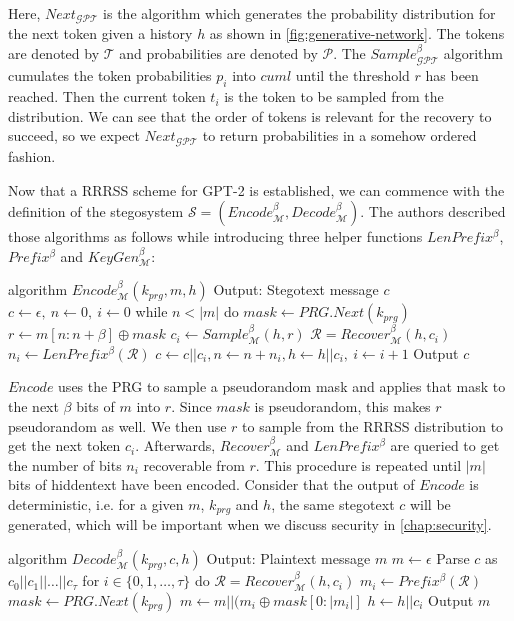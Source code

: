 Here, $Next_{\mathcal{GPT}}$ is the algorithm which generates the probability distribution for the next token given a history $h$ as shown in \autoref{fig:generative-network}.
The tokens are denoted by $\mathcal{T}$ and probabilities are denoted by $\mathcal{P}$.
The $Sample_{\mathcal{GPT}}^\beta$ algorithm cumulates the token probabilities $p_i$ into $cuml$ until the threshold $r$ has been reached.
Then the current token $t_i$ is the token to be sampled from the distribution.
We can see that the order of tokens is relevant for the recovery to succeed, so we expect $Next_{\mathcal{GPT}}$ to return probabilities in a somehow ordered fashion.

Now that a RRRSS scheme for GPT-2 is established, we can commence with the definition of the stegosystem $\mathcal{S} = \left( Encode_{\mathcal{M}}^\beta, Decode_{\mathcal{M}}^\beta \right)$.
The authors described those algorithms as follows while introducing three helper functions $LenPrefix^\beta$, $Prefix^\beta$ and $KeyGen_{\mathcal{M}}^\beta$:


\begin{Pseudocode}[caption={$Encode$ algorithm \cite{Meteor2021}}, label={alg:encode}]
algorithm $Encode_{\mathcal{M}}^\beta(k_{prg}, m, h)$
  Output: Stegotext message $c$
  $c \leftarrow \epsilon,~ n \leftarrow 0,~ i \leftarrow 0$
  while $n < |m|$ do
    $mask \leftarrow PRG.Next(k_{prg})$
    $r \leftarrow m[n:n+\beta] \oplus mask$
    $c_i \leftarrow Sample_{\mathcal{M}}^\beta(h, r)$
    $\mathcal{R} = Recover_{\mathcal{M}}^\beta(h, c_i)$
    $n_i \leftarrow LenPrefix^\beta(\mathcal{R})$
    $c \leftarrow c || c_i, n \leftarrow n+n_i, h \leftarrow h||c_i,~ i \leftarrow i + 1$
  Output $c$
\end{Pseudocode}

$Encode$ uses the PRG to sample a pseudorandom mask and applies that mask to the next $\beta$ bits of $m$ into $r$.
Since $mask$ is pseudorandom, this makes $r$ pseudorandom as well.
We then use $r$ to sample from the RRRSS distribution to get the next token $c_i$.
Afterwards, $Recover_{\mathcal{M}}^\beta$ and $LenPrefix^\beta$ are queried to get the number of bits $n_i$ recoverable from $r$.
This procedure is repeated until $|m|$ bits of hiddentext have been encoded.
Consider that the output of $Encode$ is deterministic, i.e. for a given $m$, $k_{prg}$ and $h$, the same stegotext $c$ will be generated, which will be important when we discuss security in \autoref{chap:security}.


\begin{Pseudocode}[float, caption={$Decode$ algorithm \cite{Meteor2021}}, label={alg:decode}]
algorithm $Decode_{\mathcal{M}}^\beta(k_{prg}, c, h)$
  Output: Plaintext message $m$
  $m \leftarrow \epsilon$
  Parse $c$ as $c_0 || c_1 || \dots || c_{\tau}$
  for $i \in \{ 0, 1, \dots, \tau \}$ do
    $\mathcal{R} = Recover_{\mathcal{M}}^\beta(h, c_i)$
    $m_i \leftarrow Prefix^\beta(\mathcal{R})$
    $mask \leftarrow PRG.Next(k_{prg})$
    $m \leftarrow m || (m_i \oplus mask[0: |m_i|]$
    $h \leftarrow h||c_i$
  Output $m$
\end{Pseudocode}

